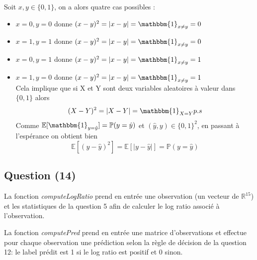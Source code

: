 \documentclass[10pt,a4paper]{report}\usepackage[]{graphicx}\usepackage[]{color}
\begin{document}
Soit $x,y \in \{0,1\}$, on a alors quatre cas possibles : 
\begin{itemize}
\item $x=0, y=0$ donne $(x-y)^2 = |x-y| = \mathbbm{1}_{x\neq y} = 0$
\item $x=1, y=1$ donne $(x-y)^2 = |x-y| = \mathbbm{1}_{x\neq y} = 0$
\item $x=0, y=1$ donne $(x-y)^2 = |x-y| = \mathbbm{1}_{x\neq y} = 1$
\item $x=1, y=0$ donne $(x-y)^2 = |x-y| = \mathbbm{1}_{x\neq y} = 1$ \\
Cela implique que si X et Y sont deux variables aleatoires à valeur dans  $\{0,1\}$ alors \[(X-Y)^2 = |X-Y| = \mathbbm{1}_{X=Y} p.s\]
Comme \(\mathbb{E}[\mathbbm{1}_{y=\hat{y}}] = \mathbb{P}(y = \hat{y})\) et $(\hat{y},y) \in \{0,1\}^2$, en passant à l'espérance on obtient bien \[\mathbb{E}[(y-\hat{y})^2] = \mathbb{E}[|y-\hat{y}|] = \mathbb{P}(y = \hat{y})\]

\end{itemize}

\subsection{Question (14)}

La fonction \emph{computeLogRatio} prend en entrée une observation (un vecteur de $\mathbb{R}^{15}$) et les statistiques de la question 5 afin de calculer le log ratio associé à l'observation.

La fonction \emph{computePred} prend en entrée une matrice d'observations et effectue pour chaque observation une prédiction selon la règle de décision de la question 12: le label prédit est 1 si le log ratio est positif et 0 sinon.
\end{document}

